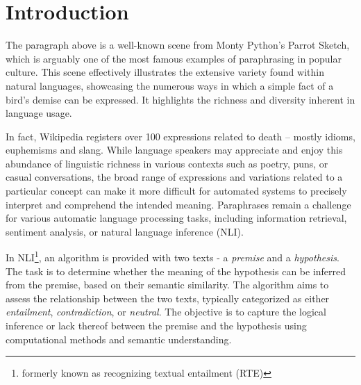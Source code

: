 \chapter*{Introduction}




The paragraph above is a well-known scene from Monty Python's Parrot Sketch, which is arguably one of the most famous examples of paraphrasing in popular culture. This scene effectively illustrates the extensive variety found within natural languages, showcasing the numerous ways in which a simple fact of a bird's demise can be expressed. It highlights the richness and diversity inherent in language usage.

In fact, Wikipedia registers over 100 expressions related to death -- mostly idioms, euphemisms and slang.  \citep{wiki:death} While language speakers may appreciate and enjoy this abundance of linguistic richness in various contexts such as poetry, puns, or casual conversations, the broad range of expressions and variations related to a particular concept can make it more difficult for automated systems to precisely interpret and comprehend the intended meaning. Paraphrases remain a challenge for various automatic language processing tasks, including information retrieval, sentiment analysis, or natural language inference (NLI).

In NLI\footnote{formerly known as recognizing textual entailment (RTE)}, an algorithm is provided with two texts - a \emph{premise} and a \emph{hypothesis}. The task is to determine whether the meaning of the hypothesis can be inferred from the premise, based on their semantic similarity. The algorithm aims to assess the relationship between the two texts, typically categorized as either \emph{entailment}, \emph{contradiction}, or \emph{neutral}. The objective is to capture the logical inference or lack thereof between the premise and the hypothesis using computational methods and semantic understanding. \citep{dagan:2005} 


